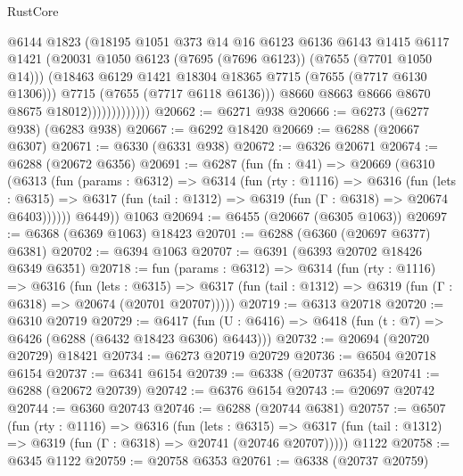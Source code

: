 \begin{lexlean}{RustCore}
\begin{coremodule}
                              @6144
                              @1823
                              (@18195
                                @1051
                                @373
                                @14
                                @16
                                @6123
                                @6136
                                @6143
                                @1415
                                @6117
                                @1421
                                (@20031 @1050 @6123 (@7695 (@7696 @6123)) (@7655 (@7701 @1050 @14)))
                                (@18463 @6129 @1421 @18304 @18365 @7715 (@7655 (@7717 @6130 @1306)))
                                @7715
                                (@7655 (@7717 @6118 @6136)))
                              @8660
                              @8663
                              @8666
                              @8670
                              @8675
                              @18012)))))))))))))
@20662 := @6271 @938
@20666 := @6273 (@6277 @938) (@6283 @938)
@20667 := @6292 @18420
@20669 := @6288 (@20667 @6307)
@20671 := @6330 (@6331 @938)
@20672 := @6326 @20671
@20674 := @6288 (@20672 @6356)
@20691 := @6287
    (fun (fn : @41) =>
    @20669
      (@6310
        (@6313
          (fun (params : @6312) =>
          @6314
            (fun (rty : @1116) =>
            @6316
              (fun (lets : @6315) =>
              @6317 (fun (tail : @1312) => @6319 (fun (Γ : @6318) => @20674 @6403))))))
        @6449))
    @1063
@20694 := @6455 (@20667 (@6305 @1063))
@20697 := @6368 (@6369 @1063) @18423
@20701 := @6288 (@6360 (@20697 @6377) @6381)
@20702 := @6394 @1063
@20707 := @6391 (@6393 @20702 @18426 @6349 @6351)
@20718 := fun (params : @6312) =>
  @6314
    (fun (rty : @1116) =>
    @6316
      (fun (lets : @6315) =>
      @6317 (fun (tail : @1312) => @6319 (fun (Γ : @6318) => @20674 (@20701 @20707)))))
@20719 := @6313 @20718
@20720 := @6310 @20719
@20729 := @6417
    (fun (U : @6416) => @6418 (fun (t : @7) => @6426 (@6288 (@6432 @18423 @6306) @6443)))
@20732 := @20694 (@20720 @20729) @18421
@20734 := @6273 @20719 @20729
@20736 := @6504 @20718 @6154
@20737 := @6341 @6154
@20739 := @6338 (@20737 @6354)
@20741 := @6288 (@20672 @20739)
@20742 := @6376 @6154
@20743 := @20697 @20742
@20744 := @6360 @20743
@20746 := @6288 (@20744 @6381)
@20757 := @6507
    (fun (rty : @1116) =>
    @6316
      (fun (lets : @6315) =>
      @6317 (fun (tail : @1312) => @6319 (fun (Γ : @6318) => @20741 (@20746 @20707)))))
    @1122
@20758 := @6345 @1122
@20759 := @20758 @6353
@20761 := @6338 (@20737 @20759)

\end{coremodule}
\end{lexlean}
